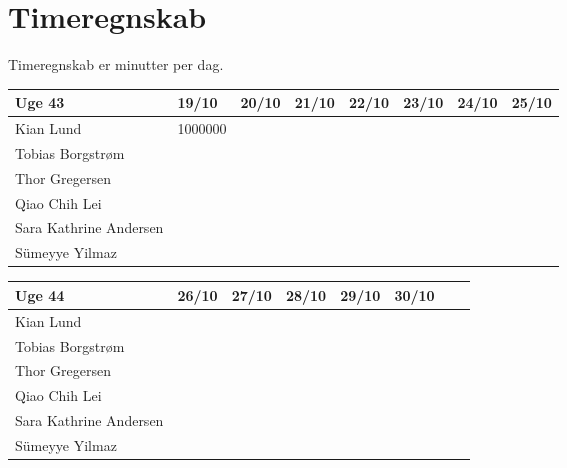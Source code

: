 \newpage
\section{Timeregnskab}
Timeregnskab er minutter per dag.

\begin{center}
\begin{tabular}{ | m{12em} | m{1cm}| m{1cm} | m{1cm} | m{1cm} | m{1cm} | m{1cm} | m{1cm} |} 
\hline
Uge 43 & 19/10 & 20/10 & 21/10 & 22/10 & 23/10 & 24/10 & 25/10\\ 
\hline
Kian Lund & 1000000 &  &  &  &  &  & \\ 
\hline
Tobias Borgstrøm &  &  &  &  &  &  & \\ 
\hline
Thor Gregersen & &  & & & &  & \\ 
\hline
Qiao Chih Lei &  &  &  &  &  &  & \\ 
\hline
Sara Kathrine Andersen &  &  &  &  &  &  & \\ 
\hline
Sümeyye Yilmaz &  &  &  &  &  &  & \\ 
\hline
\end{tabular}
\end{center}

\begin{center}
\begin{tabular}{ | m{12em} | m{1cm}| m{1cm} | m{1cm} | m{1cm} | m{1cm} | m{1cm} | m{1cm} | } 
\hline
        Uge 44 & 26/10 & 27/10 & 28/10 & 29/10 & 30/10 & &\\ 
\hline
Kian Lund & &  &  & & & &  \\ 
\hline
Tobias Borgstrøm & & & & & & &  \\ 
\hline
Thor Gregersen & & & & & & & \\ 
\hline
Qiao Chih Lei &  &  & & &   &  & \\ 
\hline
Sara Kathrine Andersen &  &  &  &  & &  & \\ 
\hline
Sümeyye Yilmaz & & & & & & & \\ 
\hline
\end{tabular}
\end{center}